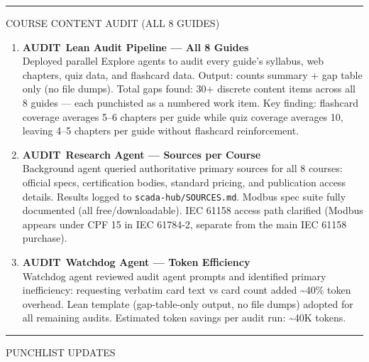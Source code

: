 \documentclass[10pt]{article}
\newcommand{\audit}{\textcolor{sred}{\small\bfseries AUDIT}}
\begin{document}
\smallskip
{\color{snavy}\rule{\linewidth}{0.4pt}}
\smallskip

{\small\sffamily\color{sgray}\MakeUppercase{Course Content Audit (All 8 Guides)}}
\smallskip

\begin{enumerate}[resume]\small
  \item \audit\ \textbf{Lean Audit Pipeline — All 8 Guides} \\
    Deployed parallel Explore agents to audit every guide's syllabus, web chapters, quiz data, and flashcard data. Output: counts summary + gap table only (no file dumps). Total gaps found: 30+ discrete content items across all 8 guides — each punchisted as a numbered work item. Key finding: flashcard coverage averages 5--6 chapters per guide while quiz coverage averages 10, leaving 4--5 chapters per guide without flashcard reinforcement.

  \item \audit\ \textbf{Research Agent — Sources per Course} \\
    Background agent queried authoritative primary sources for all 8 courses: official specs, certification bodies, standard pricing, and publication access details. Results logged to \texttt{scada-hub/SOURCES.md}. Modbus spec suite fully documented (all free/downloadable). IEC 61158 access path clarified (Modbus appears under CPF 15 in IEC 61784-2, separate from the main IEC 61158 purchase).

  \item \audit\ \textbf{Watchdog Agent — Token Efficiency} \\
    Watchdog agent reviewed audit agent prompts and identified primary inefficiency: requesting verbatim card text vs card count added \textasciitilde40\% token overhead. Lean template (gap-table-only output, no file dumps) adopted for all remaining audits. Estimated token savings per audit run: \textasciitilde40K tokens.
\end{enumerate}

\smallskip
{\color{snavy}\rule{\linewidth}{0.4pt}}
\smallskip

{\small\sffamily\color{sgray}\MakeUppercase{Punchlist Updates}}
\smallskip
\end{document}
